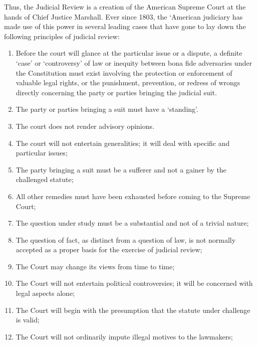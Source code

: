 \begin{multicols}{2}
\noi
Thus, the Judicial Review is a creation of the American Supreme Court at the hands of
Chief Justice Marshall. Ever since 1803, the ‘American judiciary has made use of this
power in several leading cases that have gone to lay down the following principles of
judicial review:

\newpage

\begin{enumerate}
\item Before the court will glance at the particular issue or a dispute, a definite ‘case’ or
‘controversy’ of law or inequity between bona fide adversaries under the
Constitution must exist involving the protection or enforcement of valuable legal
rights, or the punishment, prevention, or redress of wrongs directly concerning the
party or parties bringing the judicial suit.

\item The party or parties bringing a suit must have a ‘standing’.

\item The court does not render advisory opinions.

\item The court will not entertain generalities; it will deal with specific and particular
issues;

\item The party bringing a suit must be a sufferer and not a gainer by the challenged
statute;

\item All other remedies must have been exhausted before coming to the Supreme Court;

\item The question under study must be a substantial and not of a trivial nature;

\item The question of fact, as distinct from a question of law, is not normally accepted as a proper basis for the exercise of judicial review;

\item The Court may change its views from time to time;

\item The Court will not entertain political controversies; it will be concerned with legal
aspects alone;

\item  The Court will begin with the presumption that the statute under challenge is valid;

\item The Court will not ordinarily impute illegal motives to the lawmakers;


\end{enumerate}
\end{multicols}
